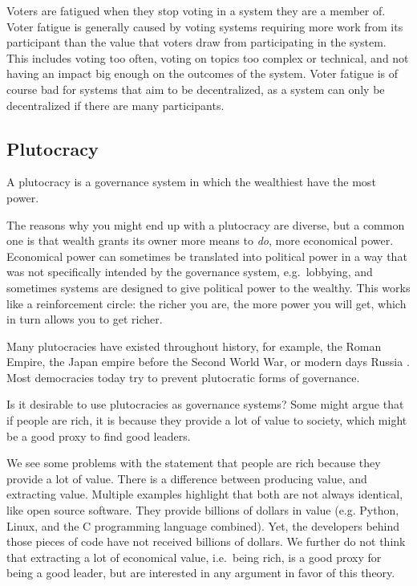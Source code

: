 Voters are fatigued when they stop voting in a system they are a member of.
Voter fatigue is generally caused by voting systems requiring more work from its participant than the value that voters draw from participating in the system.
This includes voting too often, voting on topics too complex or technical, and not having an impact big enough on the outcomes of the system.
Voter fatigue is of course bad for systems that aim to be decentralized, as a system can only be decentralized if there are many participants.

\subsection{Plutocracy}
\label{sec:plutocracy}

A plutocracy is a governance system in which the wealthiest have the most power.

The reasons why you might end up with a plutocracy are diverse, but a common one is that wealth grants its owner more means to \emph{do}, more economical power.
Economical power can sometimes be translated into political power in a way that was not specifically intended by the governance system, e.g.\ lobbying, and sometimes systems are designed to give political power to the wealthy.
This works like a reinforcement circle: the richer you are, the more power you will get, which in turn allows you to get richer.

Many plutocracies have existed throughout history, for example, the Ro\-man Empire, the Japan empire before the Second World War, or modern days Russia \cite{noauthor_plutocracy_2022}.
Most democracies today try to prevent plutocratic forms of governance.

Is it desirable to use plutocracies as governance systems?
Some might argue that if people are rich, it is because they provide a lot of value to society, which might be a good proxy to find good leaders.

We see some problems with the statement that people are rich because they provide a lot of value.
There is a difference between producing value, and extracting value.
Multiple examples highlight that both are not always identical, like open source software.
They provide billions of dollars in value (e.g. Python, Linux, and the C programming language combined).
Yet, the developers behind those pieces of code have not received billions of dollars.
We further do not think that extracting a lot of economical value, i.e.\ being rich, is a good proxy for being a good leader, but are interested in any argument in favor of this theory.

